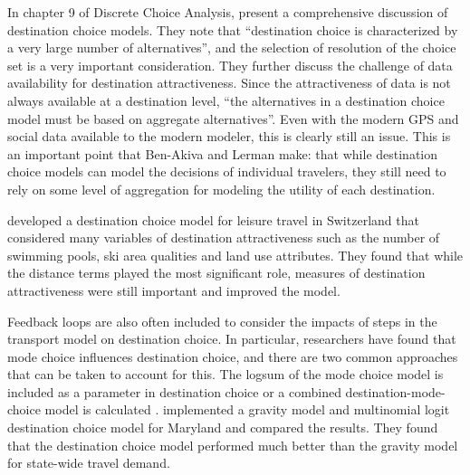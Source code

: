 In chapter 9 of Discrete Choice Analysis, \textcite{AkivaLerman85} present a comprehensive discussion of destination choice models. They note that \enquote{destination choice is characterized by a very large number of alternatives}, and the selection of resolution of the choice set is a very important consideration. They further discuss the challenge of data availability for destination attractiveness. Since the attractiveness of data is not always available at a destination level, \enquote{the alternatives in a destination choice model must be based on aggregate alternatives}. Even with the modern GPS and social data available to the modern modeler, this is clearly still an issue. This is an important point that Ben-Akiva and Lerman make: that while destination choice models can model the decisions of individual travelers, they still need to rely on some level of aggregation for modeling the utility of each destination.

\textcite{simma2001destination} developed a destination choice model for leisure travel in Switzerland that considered many variables of destination attractiveness such as the number of swimming pools, ski area qualities and land use attributes. They found that while the distance terms played the most significant role, measures of destination attractiveness were still important and improved the model. 

Feedback loops are also often included to consider the impacts of steps in the transport model on destination choice. In particular, researchers have found that mode choice influences destination choice, and there are two common approaches that can be taken to account for this. The logsum of the mode choice model is included as a parameter in destination choice \parencite{jonnalagadda2001development, mishra2011functional} or a combined destination-mode-choice model is calculated \parencite{newman2010hierarchical, adler1976joint, boyce1983implementation, Outwater15}. \parencite{Mishra13} implemented a gravity model and multinomial logit destination choice model for Maryland and compared the results. They found that the destination choice model performed much better than the gravity model for state-wide travel demand. 

